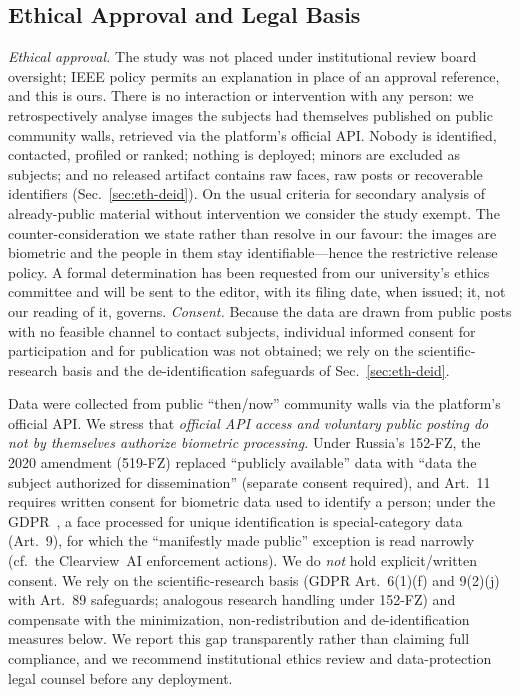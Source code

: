\documentclass[journal]{IEEEtran}
\begin{document}
\subsection{Ethical Approval and Legal Basis}\label{sec:eth-legal}
\emph{Ethical approval.} The study was not placed under institutional review board oversight; IEEE policy permits an explanation in place of an approval reference, and this is ours. There is no interaction or intervention with any person: we retrospectively analyse images the subjects had themselves published on public community walls, retrieved via the platform's official API. Nobody is identified, contacted, profiled or ranked; nothing is deployed; minors are excluded as subjects; and no released artifact contains raw faces, raw posts or recoverable identifiers (Sec.~\ref{sec:eth-deid}). On the usual criteria for secondary analysis of already-public material without intervention we consider the study exempt. The counter-consideration we state rather than resolve in our favour: the images are biometric and the people in them stay identifiable---hence the restrictive release policy. A formal determination has been requested from our university's ethics committee and will be sent to the editor, with its filing date, when issued; it, not our reading of it, governs. \emph{Consent.} Because the data are drawn from public posts with no feasible channel to contact subjects, individual informed consent for participation and for publication was not obtained; we rely on the scientific-research basis and the de-identification safeguards of Sec.~\ref{sec:eth-deid}.

Data were collected from public ``then/now'' community walls via the platform's official API. We stress that \emph{official API access and voluntary public posting do not by themselves authorize biometric processing.} Under Russia's 152-FZ, the 2020 amendment (519-FZ) replaced ``publicly available'' data with ``data the subject authorized for dissemination'' (separate consent required), and Art.~11 requires written consent for biometric data used to identify a person; under the GDPR~\cite{gdpr2016}, a face processed for unique identification is special-category data (Art.~9), for which the ``manifestly made public'' exception is read narrowly (cf.\ the Clearview~AI enforcement actions). We do \emph{not} hold explicit/written consent. We rely on the scientific-research basis (GDPR Art.~6(1)(f) and 9(2)(j) with Art.~89 safeguards; analogous research handling under 152-FZ) and compensate with the minimization, non-redistribution and de-identification measures below. We report this gap transparently rather than claiming full compliance, and we recommend institutional ethics review and data-protection legal counsel before any deployment.
\end{document}
